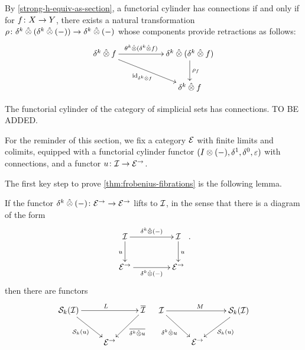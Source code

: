 \documentclass[reqno,10pt,a4paper,oneside,draft]{amsart}
\begin{document}
\begin{remark} \label{thm:retraction-for-connections}
By \cref{strong-h-equiv-as-section}, a functorial cylinder has connections if and only if for $f \co X \to Y$, there exists a natural transformation $\rho \co \kcyl \hatotimes (\kcyl \hatotimes (-)) \to \kcyl \hatotimes (-)$ whose components provide retractions as follows:
\begin{gather*}
\xymatrix@C+3em{
  \kcyl \hatotimes f
  \ar[r]^-{\thetak \hatotimes (\kcyl \hatotimes f)}
  \ar[dr]_{\id_{\kcyl \hatotimes f}}
&
  \kcyl \hatotimes (\kcyl \hatotimes f)  \ar[d]^{\rho_f}
\\&
  \kcyl \hatotimes f
}
\end{gather*}
\end{remark}

\begin{example}
The functorial cylinder of the category of simplicial sets has connections.
TO BE ADDED.
\end{example}

For the reminder of this section, we fix a category $\catE$ with finite limits and colimits, equipped with a functorial cylinder functor $(\interval \otimes (-), \rcyl, \lcyl, \ccyl)$ with connections, and a functor $u \co \cal{I} \to \cal{E}^\to$.

\medskip

The first key step to prove \cref{thm:frobenius-fibrations} is the following lemma.

\begin{lemma} \label{thm:she-to-retract-closure}
If the functor $\kcyl \hatotimes (-) \co \catE^\to \to \catE^\to$ lifts to $\cal{I}$, in the sense that there is a diagram of the form
\[
\xymatrix@C+2em{
  \cal{I}  \ar[d]_u \ar[r]^{\kcyl \hatotimes (-)} & \cal{I} \ar[d]^{u} \\
  \cal{E}^\to \ar[r]_{\kcyl \hatotimes (-)} & \cal{E}^\to} \, .
\]
then there are functors
\begin{align*}
\xycenter{
  \cal{S}_k(\cal{I}) \ar[dr]_{\cal{S}_k(u)} \ar[rr]^L & & \overline{\cal{I}} \ar[dl]^-{\overline{\kcyl \hatotimes u}} \\
  & \catE^\to &
}
&&
\xycenter{
 \cal{I} \ar[dr]_{\kcyl \hatotimes u} \ar[rr]^M & & \cal{S}_k(\cal{I}) \ar[dl]^{\cal{S}_k(u)} \\
 & \ \catE^\to &
}
\end{align*}
\end{lemma}
\end{document}

